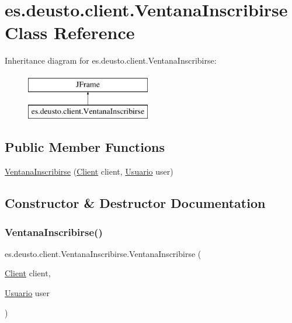 \hypertarget{classes_1_1deusto_1_1client_1_1_ventana_inscribirse}{}\section{es.\+deusto.\+client.\+Ventana\+Inscribirse Class Reference}
\label{classes_1_1deusto_1_1client_1_1_ventana_inscribirse}
Inheritance diagram for es.\+deusto.\+client.\+Ventana\+Inscribirse\+:\begin{figure}[H]
\begin{center}
\leavevmode
\includegraphics[height=2.000000cm]{classes_1_1deusto_1_1client_1_1_ventana_inscribirse}
\end{center}
\end{figure}
\subsection*{Public Member Functions}
\begin{DoxyCompactItemize}
\item 
\mbox{\hyperlink{classes_1_1deusto_1_1client_1_1_ventana_inscribirse_a6a94a08764b1382b4f5b3545c92e0ad8}{Ventana\+Inscribirse}} (\mbox{\hyperlink{classes_1_1deusto_1_1client_1_1_client}{Client}} client, \mbox{\hyperlink{classes_1_1deusto_1_1server_1_1jdo_1_1_usuario}{Usuario}} user)
\end{DoxyCompactItemize}


\subsection{Constructor \& Destructor Documentation}
\mbox{\label{classes_1_1deusto_1_1client_1_1_ventana_inscribirse_a6a94a08764b1382b4f5b3545c92e0ad8}} 
\subsubsection{\texorpdfstring{VentanaInscribirse()}{VentanaInscribirse()}}
{\footnotesize\ttfamily es.\+deusto.\+client.\+Ventana\+Inscribirse.\+Ventana\+Inscribirse (\begin{DoxyParamCaption}\item[{\mbox{\hyperlink{classes_1_1deusto_1_1client_1_1_client}{Client}}}]{client,  }\item[{\mbox{\hyperlink{classes_1_1deusto_1_1server_1_1jdo_1_1_usuario}{Usuario}}}]{user }\end{DoxyParamCaption})}



